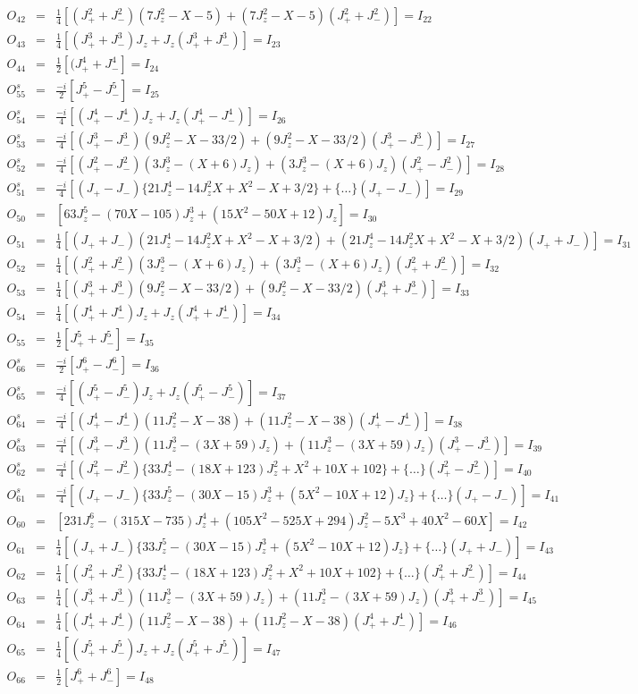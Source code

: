 \begin{eqnarray*}
O_{42}&=&\frac{1}{4}[(J_+^2+J_-^2)(7J_z^2-X-5)+(7J_z^2-X-5)(J_+^2+J_-^2)] =I_{22}\\
O_{43}&=&\frac{1}{4}[(J_+^3+J_-^3)J_z+J_z(J_+^3+J_-^3)]=I_{23} \\
O_{44}&=&\frac{1}{2}[(J_+^4+J_-^4]=I_{24}\\
\hline
O^s_{55}&=&\frac{-i}{2}[J_+^5-J_-^5]=I_{25} \\
O^s_{54}&=&\frac{-i}{4}[(J_+^4-J_-^4)J_z+J_z(J_+^4-J_-^4)]=I_{26} \\
O^s_{53}&=&\frac{-i}{4}[(J_+^3-J_-^3)(9J_z^2-X-33/2)+(9J_z^2-X-33/2)(J_+^3-J_-^3)]=I_{27} \\
O^s_{52}&=&\frac{-i}{4}[(J_+^2-J_-^2)(3J_z^3-(X+6)J_z)+(3J_z^3-(X+6)J_z)(J_+^2-J_-^2)]=I_{28}\\
O^s_{51}&=&\frac{-i}{4}[(J_+-J_-)\{21J_z^4-14J_z^2X+X^2-X+3/2\}+\{\dots\}(J_+-J_-)]=I_{29} \\
O_{50}&=&[63J_z^5-(70X-105)J_z^3+(15X^2-50X+12)J_z]=I_{30} \\
O_{51}&=&\frac{1}{4}[(J_++J_-)(21J_z^4-14J_z^2X+X^2-X+3/2)+(21J_z^4-14J_z^2X+X^2-X+3/2)(J_++J_-)]=I_{31} \\
O_{52}&=&\frac{1}{4}[(J_+^2+J_-^2)(3J_z^3-(X+6)J_z)+(3J_z^3-(X+6)J_z)(J_+^2+J_-^2)] =I_{32}\\
O_{53}&=&\frac{1}{4}[(J_+^3+J_-^3)(9J_z^2-X-33/2)+(9J_z^2-X-33/2)(J_+^3+J_-^3)]=I_{33} \\
O_{54}&=&\frac{1}{4}[(J_+^4+J_-^4)J_z+J_z(J_+^4+J_-^4)]=I_{34} \\
O_{55}&=&\frac{1}{2}[J_+^5+J_-^5]=I_{35} \\
\hline
O^s_{66}&=&\frac{-i}{2}[J_+^6-J_-^6]=I_{36}\\
O^s_{65}&=&\frac{-i}{4}[(J_+^5-J_-^5)J_z+J_z(J_+^5-J_-^5)] =I_{37}\\
O^s_{64}&=&\frac{-i}{4}[(J_+^4-J_-^4)(11J_z^2-X-38)+(11J_z^2-X-38)(J_+^4-J_-^4)]=I_{38} \\
O^s_{63}&=&\frac{-i}{4}[(J_+^3-J_-^3)(11J_z^3-(3X+59)J_z)+(11J_z^3-(3X+59)J_z)(J_+^3-J_-^3)]=I_{39} \\
O^s_{62}&=&\frac{-i}{4}[(J_+^2-J_-^2)\{33J_z^4-(18X+123)J_z^2+X^2+10X+102\}+\{\dots\}(J_+^2-J_-^2)]=I_{40} \\
O^s_{61}&=&\frac{-i}{4}[(J_+-J_-)\{33J_z^5-(30X-15)J_z^3+(5X^2-10X+12)J_z\}+\{\dots\}(J_+-J_-)]=I_{41} \\
O_{60}&=&[231J_z^6-(315X-735)J_z^4+(105X^2-525X+294)J_z^2-5X^3+40X^2-60X]=I_{42} \\
O_{61}&=&\frac{1}{4}[(J_++J_-)\{33J_z^5-(30X-15)J_z^3+(5X^2-10X+12)J_z\}+\{\dots\}(J_++J_-)]=I_{43} \\
O_{62}&=&\frac{1}{4}[(J_+^2+J_-^2)\{33J_z^4-(18X+123)J_z^2+X^2+10X+102\}+\{\dots\}(J_+^2+J_-^2)]=I_{44} \\
O_{63}&=&\frac{1}{4}[(J_+^3+J_-^3)(11J_z^3-(3X+59)J_z)+(11J_z^3-(3X+59)J_z)(J_+^3+J_-^3)]=I_{45} \\
O_{64}&=&\frac{1}{4}[(J_+^4+J_-^4)(11J_z^2-X-38)+(11J_z^2-X-38)(J_+^4+J_-^4)]=I_{46} \\
O_{65}&=&\frac{1}{4}[(J_+^5+J_-^5)J_z+J_z(J_+^5+J_-^5)]=I_{47} \\
O_{66}&=&\frac{1}{2}[J_+^6+J_-^6]=I_{48}\\
\end{eqnarray*}



